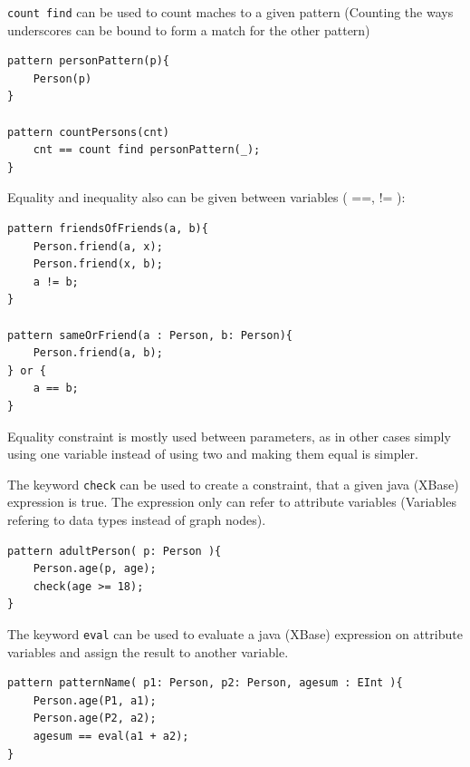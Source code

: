 \begin{minipage}{\textwidth}
\texttt{count find} can be used to count maches to a given pattern (Counting the ways underscores can be bound to form a match for the other pattern)
\begin{lstlisting}[language=vql]
pattern personPattern(p){
	Person(p)
}

pattern countPersons(cnt)
	cnt == count find personPattern(_);
}
\end{lstlisting}
	
\end{minipage}
\vspace{\belowdisplayskip}



\begin{minipage}{\textwidth}
Equality and inequality also can be given between variables ( ==, != ):
\begin{lstlisting}[language=vql]
pattern friendsOfFriends(a, b){
	Person.friend(a, x);
	Person.friend(x, b);
	a != b;
}

pattern sameOrFriend(a : Person, b: Person){
	Person.friend(a, b);
} or {
	a == b;
}
\end{lstlisting}
	
Equality constraint is mostly used between parameters, as in other cases simply using one variable instead of using two and making them equal is simpler.  
	
\end{minipage}
\vspace{\belowdisplayskip}



\begin{minipage}{\textwidth}
The keyword \texttt{check} can be used to create a constraint, that a given java (XBase) expression is true. The expression only can refer to attribute  variables (Variables refering to data types instead of graph nodes).
\begin{lstlisting}[language=vql]
pattern adultPerson( p: Person ){
	Person.age(p, age);
	check(age >= 18);
}
\end{lstlisting}
\end{minipage}
\vspace{\belowdisplayskip}

\begin{minipage}{\textwidth}
The keyword \texttt{eval} can be used to evaluate a java (XBase) expression on attribute variables and assign the result to another variable.
\begin{lstlisting}[language=vql]
pattern patternName( p1: Person, p2: Person, agesum : EInt ){
	Person.age(P1, a1);
	Person.age(P2, a2);
	agesum == eval(a1 + a2);
}
\end{lstlisting}
\end{minipage}
\vspace{\belowdisplayskip}

